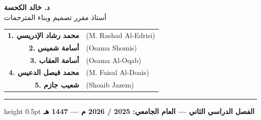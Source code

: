 \documentclass[12pt,a4paper]{report}
\begin{document}
\begin{titlepage}
    \vspace{0.8cm}
    
    \begin{minipage}[t]{0.45\textwidth}
        \begin{tcolorbox}[colback=white,colframe=gray!60,arc=2mm,title=\textbf{إشراف الدكتور الفاضل:}]
            \centering
            \vspace{0.2cm}
            {\Large\bfseries د. خالد الكحسة}\\[0.2cm]
            {\small أستاذ مقرر تصميم وبناء المترجمات}\\[0.2cm]
        \end{tcolorbox}
    \end{minipage}
    \hfill
    \begin{minipage}[t]{0.50\textwidth}
        \begin{tcolorbox}[colback=white,colframe=gray!60,arc=2mm,title=\textbf{إعداد طلاب المجموعة (رقم: 01):}]
            \small
            \begin{tabular}{r l}
                \textbf{1. محمد رشاد الإدريسي} & \textenglish{(M. Rashad Al-Edrisi)} \\
                \textbf{2. أسامة شميس} & \textenglish{(Osama Shomis)} \\
                \textbf{3. أسامة العقاب} & \textenglish{(Osama Al-Oqab)} \\
                \textbf{4. محمد فيصل الدعيس} & \textenglish{(M. Faisal Al-Doais)} \\
                \textbf{5. شعيب جازم} & \textenglish{(Shoaib Jazem)} \\
            \end{tabular}
        \end{tcolorbox}
    \end{minipage}
    
    \vfill
    
    \hrule height 0.5pt
    \vspace{0.3cm}
    {\normalsize\bfseries الفصل الدراسي الثاني — العام الجامعي: 2025 / 2026 م — 1447 هـ}\\[0.2cm]
    
\end{titlepage}

\tableofcontents
\newpage

\end{document}
